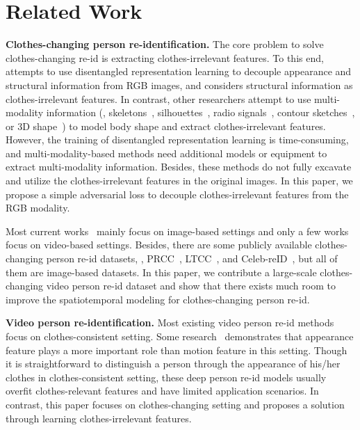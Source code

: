 \documentclass[10pt,twocolumn,letterpaper]{article}
\begin{document}
\section{Related Work}
\noindent
{\bf Clothes-changing person re-identification.}
The core problem to solve clothes-changing re-id is extracting clothes-irrelevant features. 
To this end, \cite{Zhang2019Gait, DGNet} attempts to use disentangled representation learning to decouple appearance and structural information from RGB images, and considers structural information as clothes-irrelevant features. In contrast, other researchers attempt to use multi-modality information (\eg, skeletons~\cite{Qian2020LTCC}, silhouettes~\cite{Jin2021Cloth, Hong2021Finegrained}, radio signals~\cite{Fan2020Radio}, contour sketches~\cite{Yang2019PRCC}, or 3D shape~\cite{Chen2021Learning3D}) to model body shape and extract clothes-irrelevant features. However, the training of disentangled representation learning is time-consuming, and multi-modality-based methods need additional models or equipment to extract multi-modality information. 
Besides, these methods do not fully excavate and utilize the clothes-irrelevant features in the original images.
In this paper, we propose a simple adversarial loss to decouple clothes-irrelevant features from the RGB modality.

Most current works~\cite{Hong2021Finegrained,Chen2021Learning3D,Yang2019PRCC,Qian2020LTCC,huang2019beyond,huang2019celebrities} mainly focus on image-based settings and only a few works~\cite{Fan2020Radio,Zhang2021Learning,Gou2016Person} focus on video-based settings.
Besides, there are some publicly available clothes-changing person re-id datasets, \eg, PRCC~\cite{Yang2019PRCC}, LTCC~\cite{Qian2020LTCC}, and Celeb-reID~\cite{huang2019celebrities,huang2019beyond}, but all of them are image-based datasets.
In this paper, we contribute a large-scale clothes-changing video person re-id dataset and show that there exists much room to improve the spatiotemporal modeling for clothes-changing person re-id.

\medskip
\noindent
{\bf Video person re-identification.}
Most existing video person re-id methods~\cite{Wang2014Person, Gu2020AP3D, Hou2020TCL, Hou2019vrstc,Hou2020IAUNet} focus on clothes-consistent setting.
Some research~\cite{Chen2020AFA} demonstrates that appearance feature plays a more important role than motion feature in this setting.
Though it is straightforward to distinguish a person through the appearance of his/her clothes in clothes-consistent setting, these deep person re-id models usually overfit clothes-relevant features and have limited application scenarios.
In contrast, this paper focuses on clothes-changing setting and proposes a solution through learning clothes-irrelevant features.
\end{document}

